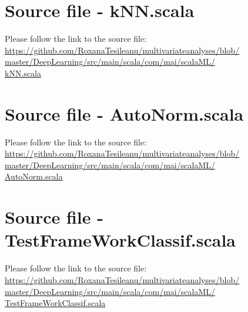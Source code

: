\documentclass[twoside, 11p]{article}
\begin{document}
\section{Source file - kNN.scala}

Please follow the link to the source file:\\
\href{https://github.com/RoxanaTesileanu/multivariate_analyses/blob/master/DeepLearning/src/main/scala/com/mai/scalaML/kNN.scala}{https://github.com/RoxanaTesileanu/multivariate\underline{\space}analyses/blob/\\master/DeepLearning/src/main/scala/com/mai/scalaML/\\kNN.scala}

\section{Source file - AutoNorm.scala}

Please follow the link to the source file:\\
\href{https://github.com/RoxanaTesileanu/multivariate_analyses/blob/master/DeepLearning/src/main/scala/com/mai/scalaML/AutoNorm.scala}{https://github.com/RoxanaTesileanu/multivariate\underline{\space}analyses/blob/\\master/DeepLearning/src/main/scala/com/mai/scalaML/\\AutoNorm.scala}

\section{Source file - TestFrameWorkClassif.scala}

Please follow the link to the source file:\\
\href{https://github.com/RoxanaTesileanu/multivariate_analyses/blob/master/DeepLearning/src/main/scala/com/mai/scalaML/TestFrameWorkClassif.scala}{https://github.com/RoxanaTesileanu/multivariate\underline{\space}analyses/blob/\\master/DeepLearning/src/main/scala/com/mai/scalaML/\\TestFrameWorkClassif.scala}






\end{document}
